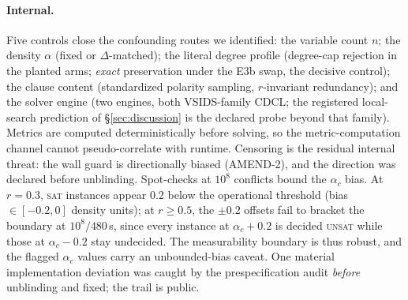 \documentclass[11pt]{article}
\begin{document}
\paragraph{Internal.}
Five controls close the confounding routes we identified: the variable count
$n$; the density $\alpha$ (fixed or $\Delta$-matched); the literal degree
profile (degree-cap rejection in the planted arms; \emph{exact} preservation
under the E3b swap, the decisive control); the clause content (standardized
polarity sampling, $r$-invariant redundancy); and the solver engine (two
engines, both VSIDS-family CDCL; the registered local-search prediction of
\S\ref{sec:discussion} is the declared probe beyond that family). Metrics are computed deterministically before solving, so the
metric-computation channel cannot pseudo-correlate with runtime. Censoring is
the residual internal threat: the wall guard is directionally biased
(AMEND-2), and the direction was declared before unblinding. Spot-checks at
$10^8$ conflicts bound the $\alpha_c$ bias. At $r=0.3$, \textsc{sat}
instances appear $0.2$ below the operational threshold (bias $\in[-0.2,0]$
density units); at $r\ge0.5$, the $\pm0.2$ offsets fail to bracket the
boundary at $10^8/480$\,s, since every instance at $\alpha_c+0.2$ is decided
\textsc{unsat} while those at $\alpha_c-0.2$ stay undecided. The
measurability boundary is thus robust, and the flagged $\alpha_c$ values
carry an unbounded-bias caveat.
One material implementation
deviation was caught by the prespecification audit \emph{before} unblinding
and fixed; the trail is public.
\end{document}
